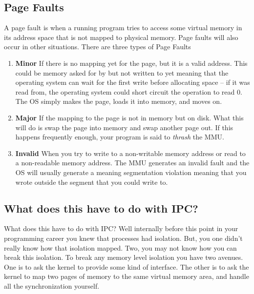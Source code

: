 \subsection{Page Faults}

A page fault is when a running program tries to access some virtual memory in its address space that is not mapped to physical memory.
Page faults will also occur in other situations.
There are three types of Page Faults

\begin{enumerate}
\item \textbf{Minor} If there is no mapping yet for the page, but it is a valid address.
  This could be memory asked for by  but not written to yet meaning that the operating system can wait for the first write before allocating space -- if it was read from, the operating system could short circuit the operation to read 0.
  The OS simply makes the page, loads it into memory, and moves on.

\item \textbf{Major} If the mapping to the page is not in memory but on disk.
  What this will do is swap the page into memory and swap another page out.
  If this happens frequently enough, your program is said to \emph{thrash} the MMU.

\item \textbf{Invalid} When you try to write to a non-writable memory address or read to a non-readable memory address.
  The MMU generates an invalid fault and the OS will usually generate a  meaning segmentation violation meaning that you wrote outside the segment that you could write to.

\end{enumerate}

\subsection{What does this have to do with IPC?}

What does this have to do with IPC?
Well internally before this point in your programming career you knew that processes had isolation.
But, you one didn't really know how that isolation mapped.
Two, you may not know how you can break this isolation.
To break any memory level isolation you have two avenues.
One is to ask the kernel to provide some kind of interface.
The other is to ask the kernel to map two pages of memory to the same virtual memory area, and handle all the synchronization yourself.

